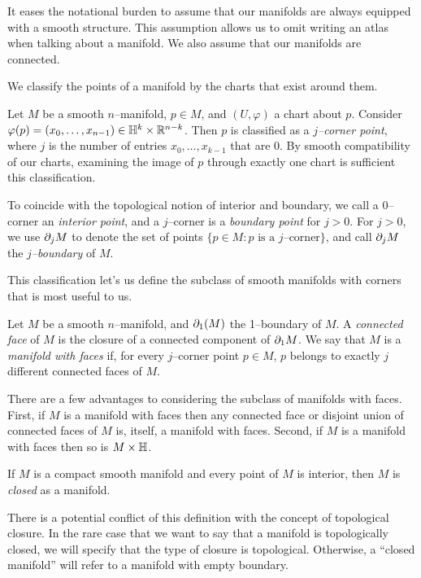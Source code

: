 It eases the notational burden to assume that our manifolds are always equipped with a smooth structure.
This assumption allows us to omit writing an atlas when talking about a manifold.
We also assume that our manifolds are connected.

We classify the points of a manifold by the charts that exist around them.

\begin{defn}
	Let $M$ be a smooth $n$--manifold, $p\in M$, and $(U,\varphi)$ a chart about $p$.
	Consider $\varphi(p)=(x_0,\dots,x_{n-1})\in \mathbb{H}^k\times\mathbb{R}^{n-k}$.
	Then $p$ is classified as a \emph{$j$--corner point}, where $j$ is the number of entries $x_0,\dots,x_{k-1}$ that are 0.
	By smooth compatibility of our charts, examining the image of $p$ through exactly one chart is sufficient this classification.
	
	To coincide with the topological notion of interior and boundary, we call a $0$--corner an \emph{interior point}, and a $j$--corner is a \emph{boundary point} for $j>0$.
	For $j>0$, we use $\partial_j M$ to denote the set of points $\{p\in M:p\textrm{ is a }j\textrm{--corner}\}$, and call $\partial_j M$ the \emph{$j$--boundary} of $M$. 
\end{defn}	

This classification let's us define the subclass of smooth manifolds with corners that is most useful to us.

\begin{defn}
	Let $M$ be a smooth $n$--manifold, and $\partial_1(M)$ the 1--boundary of $M$.
	A \emph{connected face} of $M$ is the closure of a connected component of $\partial_1 M$.
	We say that $M$ is a \emph{manifold with faces} if, for every $j$--corner point $p\in M$, $p$ belongs to exactly $j$ different connected faces of $M$.
\end{defn}

There are a few advantages to considering the subclass of manifolds with faces.
First, if $M$ is a manifold with faces then any connected face or disjoint union of connected faces of $M$ is, itself, a manifold with faces.
Second, if $M$ is a manifold with faces then so is $M\times \mathbb{H}$.
	
\begin{defn}
	If $M$ is a compact smooth manifold and every point of $M$ is interior, then $M$ is \emph{closed} as a manifold.
\end{defn}

There is a potential conflict of this definition with the concept of topological closure.
In the rare case that we want to say that a manifold is topologically closed, we will specify that the type of closure is topological.
Otherwise, a ``closed manifold'' will refer to a manifold with empty boundary.

